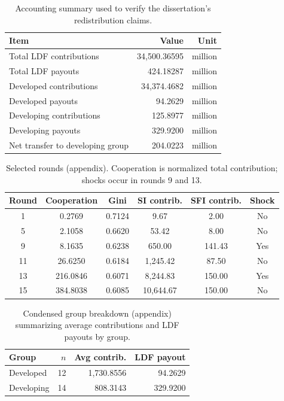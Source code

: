 \documentclass[12pt,letterpaper]{report}
\begin{document}
\begin{table}[H]
\centering
\small
\begin{tabular}{lrr}
\toprule
Item & Value & Unit \\
\midrule
Total LDF contributions & 34,500.36595 & million \\
Total LDF payouts & 424.18287 & million \\
Developed contributions & 34,374.4682 & million \\
Developed payouts & 94.2629 & million \\
Developing contributions & 125.8977 & million \\
Developing payouts & 329.9200 & million \\
Net transfer to developing group & 204.0223 & million \\
\bottomrule
\end{tabular}
\caption{Accounting summary used to verify the dissertation's redistribution claims.}
\label{tab:ldf_accounting}
\end{table}

\begin{table}[H]
\centering
\small
\begin{tabular}{cccccc}
\toprule
Round & Cooperation & Gini & SI contrib. & SFI contrib. & Shock \\
\midrule
1  & 0.2769   & 0.7124 & 9.67      & 2.00   & No \\
5  & 2.1058   & 0.6620 & 53.42     & 8.00   & No \\
9  & 8.1635   & 0.6238 & 650.00    & 141.43 & Yes \\
11 & 26.6250  & 0.6184 & 1,245.42  & 87.50  & No \\
13 & 216.0846 & 0.6071 & 8,244.83  & 150.00 & Yes \\
15 & 384.8038 & 0.6085 & 10,644.67 & 150.00 & No \\
\bottomrule
\end{tabular}
\caption{Selected rounds (appendix). Cooperation is normalized total contribution; shocks occur in rounds 9 and 13.}
\label{tab:appendix_macro_selected}
\end{table}

\begin{table}[H]
\centering
\small
\begin{tabular}{lrrr}
\toprule
Group & $n$ & Avg contrib. & LDF payout \\
\midrule
Developed & 12 & 1,730.8556 & 94.2629 \\
Developing & 14 & 808.3143 & 329.9200 \\
\bottomrule
\end{tabular}
\caption{Condensed group breakdown (appendix) summarizing average contributions and LDF payouts by group.}
\label{tab:appendix_group_summary}
\end{table}
\end{document}
